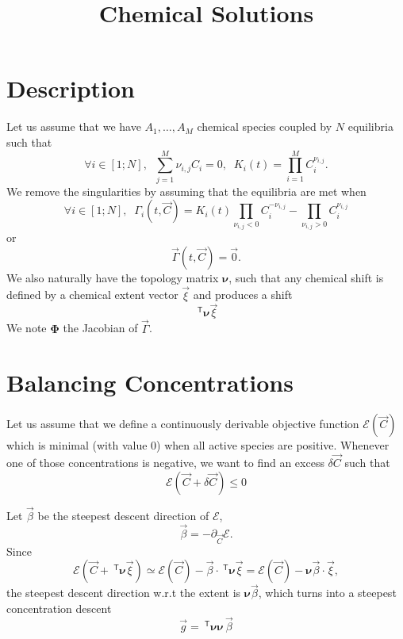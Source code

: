 \documentclass[aps]{revtex4}
\newcommand{\mymat}[1]{\bm{#1}}
\newcommand{\mytrn}[1]{~^{\mathsf{T}}{#1}}
\begin{document}
\title{Chemical Solutions}

\section{Description}
Let us assume that we have $A_1,\ldots,A_M$ chemical species coupled by
$N$ equilibria such that
\begin{equation}
	\forall i \in [1;N], \;\; \sum_{j=1}^{M} \nu_{i,j} C_i = 0, \;\; K_i(t) = \prod_{i=1}^{M} C_i^{\nu_{i,j}}.
\end{equation}
We remove the singularities by assuming that the equilibria are met when
\begin{equation}
	\forall i \in [1;N], \;\; \Gamma_i(t,\vec{C}) = K_i(t) \prod_{\nu_{i,j}<0}  C_i^{-\nu_{i,j}} -  \prod_{\nu_{i,j}>0} C_i^{\nu_{i,j}} 
\end{equation}
or
\begin{equation}
	\vec{\Gamma}(t,\vec{C}) = \vec{0}.
\end{equation}
We also naturally have the topology matrix $\mymat{\nu}$, such that
any chemical shift is defined by a  chemical extent vector $\vec{\xi}$ and
produces a shift
$$
	\mytrn{\mymat{\nu}}\vec{\xi}
$$
We note $\mymat{\Phi}$ the Jacobian of $\vec{\Gamma}$.

\section{Balancing Concentrations}

Let us assume that we define a continuously derivable objective function $\mathcal{E}\left(\vec{C}\right)$ which is minimal (with value 0) when all active species are positive. Whenever one of those concentrations is negative, we want to find an excess
$\delta\vec{C}$ such that
\begin{equation}
	\mathcal{E}\left(\vec{C}+\delta\vec{C}\right) \leq 0
\end{equation}

Let $\vec{\beta}$ be the steepest descent direction of $\mathcal{E}$,
\begin{equation}
	\vec{\beta} = -\partial_{\vec{C}} \mathcal{E}.
\end{equation}
Since
\begin{equation}
	\mathcal{E}
	\left(\vec{C}+\mytrn{\mymat{\nu}}\vec{\xi}\right) 
	\simeq \mathcal{E}\left(\vec{C}\right) - \vec{\beta} \cdot \mytrn{\mymat{\nu}}\vec{\xi}
	= \mathcal{E}\left(\vec{C}\right) - \mymat{\nu}\vec{\beta}\cdot\vec{\xi},
\end{equation}
the steepest descent direction w.r.t the extent is $\mymat{\nu}\vec{\beta}$, which turns into
a steepest concentration descent 
\begin{equation}
	\vec{g} = \mytrn{\mymat{\nu}} \mymat{\nu} \, \vec{\beta}
\end{equation}
\end{document}
